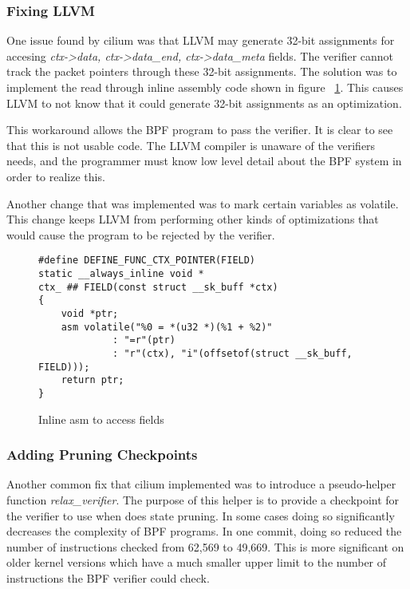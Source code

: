 \subsubsection{Fixing LLVM}
One issue found by cilium was that LLVM may generate 32-bit assignments for accesing \emph{ctx->data, ctx->data\_end, ctx->data\_meta} fields.
The verifier cannot track the packet pointers through these 32-bit assignments.
The solution was to implement the read through inline assembly code shown in figure ~\ref{fig:inline-asm}.
This causes LLVM to not know that it could generate 32-bit assignments as an optimization.



This workaround allows the BPF program to pass the verifier.
It is clear to see that this is not usable code.
The LLVM compiler is unaware of the verifiers needs, and the programmer must know low level detail about the BPF system in order to realize this.

Another change that was implemented was to mark certain variables as volatile.
This change keeps LLVM from performing other kinds of optimizations that would cause the program to be rejected by the verifier.

\begin{figure}
    \begin{lstlisting}[language=myC]
#define DEFINE_FUNC_CTX_POINTER(FIELD)
static __always_inline void *
ctx_ ## FIELD(const struct __sk_buff *ctx)
{
	void *ptr;
	asm volatile("%0 = *(u32 *)(%1 + %2)"
		     : "=r"(ptr)
		     : "r"(ctx), "i"(offsetof(struct __sk_buff, FIELD)));
	return ptr;	
}
    \end{lstlisting}
    \caption{Inline asm to access fields}
    \label{fig:inline-asm}
\end{figure}

\subsubsection{Adding Pruning Checkpoints}
Another common fix that cilium implemented was to introduce a pseudo-helper function \emph{relax\_verifier}.
The purpose of this helper is to provide a checkpoint for the verifier to use when does state pruning.
In some cases doing so significantly decreases the complexity of BPF programs.
In one commit, doing so reduced the number of instructions checked from 62,569 to 49,669.
This is more significant on older kernel versions which have a much smaller upper limit to the number of instructions the BPF verifier could check.

